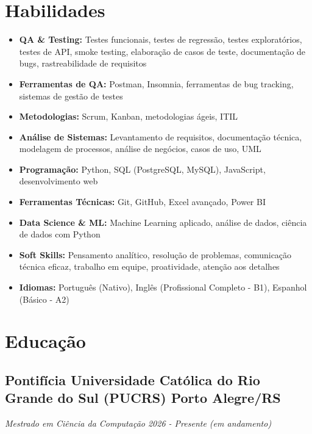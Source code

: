\documentclass[a4paper,10pt]{article}
\begin{document}

\section{Habilidades}
    \begin{itemize}
        \item \textbf{QA \& Testing:} Testes funcionais, testes de regressão, testes exploratórios, testes de API, smoke testing, elaboração de casos de teste, documentação de bugs, rastreabilidade de requisitos
        \item \textbf{Ferramentas de QA:} Postman, Insomnia, ferramentas de bug tracking, sistemas de gestão de testes
        \item \textbf{Metodologias:} Scrum, Kanban, metodologias ágeis, ITIL
        \item \textbf{Análise de Sistemas:} Levantamento de requisitos, documentação técnica, modelagem de processos, análise de negócios, casos de uso, UML
        \item \textbf{Programação:} Python, SQL (PostgreSQL, MySQL), JavaScript, desenvolvimento web
        \item \textbf{Ferramentas Técnicas:} Git, GitHub, Excel avançado, Power BI
        \item \textbf{Data Science \& ML:} Machine Learning aplicado, análise de dados, ciência de dados com Python
        \item \textbf{Soft Skills:} Pensamento analítico, resolução de problemas, comunicação técnica eficaz, trabalho em equipe, proatividade, atenção aos detalhes
        \item \textbf{Idiomas:} Português (Nativo), Inglês (Profissional Completo - B1), Espanhol (Básico - A2)
    \end{itemize}


\section{Educação}

     \subsection*{\texorpdfstring{
            \textbf{Pontifícia Universidade Católica do Rio Grande do Sul (PUCRS)} \hfill Porto Alegre/RS
        }{
            Pontifícia Universidade Católica do Rio Grande do Sul (PUCRS) -- Porto Alegre
        }}
    \textit{Mestrado em Ciência da Computação \hfill 2026 - Presente (em andamento)}
    
\end{document}
